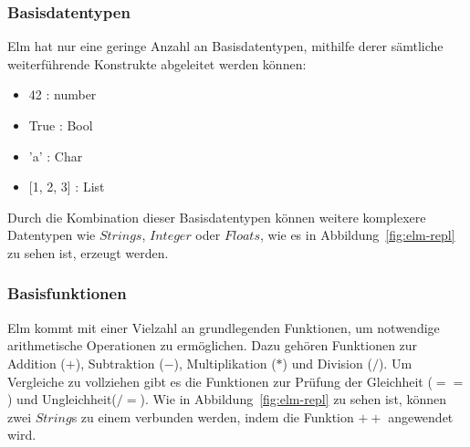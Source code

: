 \subsubsection{Basisdatentypen}
\label{sec:Basisdatentypen}
Elm hat nur eine geringe Anzahl an Basisdatentypen, mithilfe derer sämtliche weiterführende Konstrukte abgeleitet werden können:
\begin{itemize}
	\item 42 : number
	\item True : Bool
	\item 'a' : Char
	\item {[1, 2, 3] : List}
\end{itemize}
Durch die Kombination dieser Basisdatentypen können weitere komplexere Datentypen wie $Strings$, $Integer$ oder $Floats$, wie es in Abbildung~\ref{fig:elm-repl} zu sehen ist, erzeugt werden.

\subsubsection{Basisfunktionen}
\label{sec:Basisfunktionen}
Elm kommt mit einer Vielzahl an grundlegenden Funktionen, um notwendige arithmetische Operationen zu ermöglichen. Dazu gehören Funktionen zur Addition ($+$), Subtraktion ($-$), Multiplikation ($*$) und Division ($/$). Um Vergleiche zu vollziehen gibt es die Funktionen zur Prüfung der Gleichheit ($==$) und Ungleichheit($/=$). Wie in Abbildung~\ref{fig:elm-repl} zu sehen ist, können zwei $String$s zu einem verbunden werden, indem die Funktion $++$ angewendet wird.

